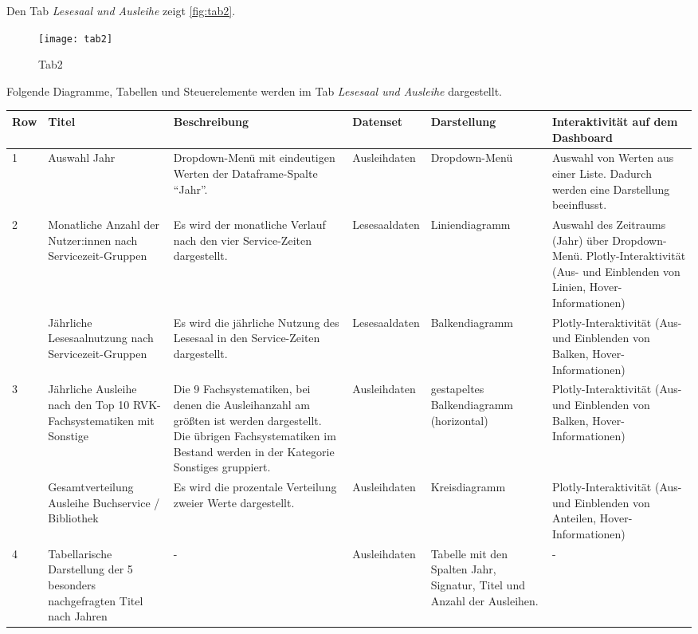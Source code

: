 Den Tab \textit{Lesesaal und Ausleihe} zeigt \autoref{fig:tab2}.

    \begin{figure}[H]
        \centering
            \texttt{[image: tab2]}
            \caption{Tab2}
            \label{fig:tab2}
    \end{figure}
    
\clearpage
Folgende Diagramme, Tabellen und Steuerelemente werden im Tab \textit{Lesesaal und Ausleihe} dargestellt.


    \begingroup
    \setlength{\tabcolsep}{12pt} %
    \renewcommand{\arraystretch}{1.5} 
    \begin{table}[H]
        \centering
        \begin{adjustbox}{max width=\textwidth}
        \begin{tabular}{p{}p{}p{}p{}p{}p{}}
           \toprule
           Row        &Titel &Beschreibung &Datenset &Darstellung &Interaktivität auf dem Dashboard\\
           \midrule
            1           &Auswahl  Jahr &Dropdown-Menü mit eindeutigen Werten der Dataframe-Spalte \enquote{Jahr}.&Ausleihdaten&Dropdown-Menü &Auswahl von Werten aus einer Liste. Dadurch werden eine Darstellung beeinflusst.\\
           \midrule
            2           &Monatliche Anzahl der Nutzer:innen nach Servicezeit-Gruppen&Es wird der monatliche Verlauf nach den vier Service-Zeiten dargestellt.&Lesesaaldaten&Liniendiagramm&Auswahl des Zeitraums (Jahr) über Dropdown-Menü. Plotly-Interaktivität (Aus- und Einblenden von Linien, Hover-Informationen)\\
                        &Jährliche Lesesaalnutzung nach Servicezeit-Gruppen&Es wird die jährliche Nutzung des Lesesaal in den Service-Zeiten dargestellt.&Lesesaaldaten&Balkendiagramm    &Plotly-Interaktivität (Aus- und Einblenden von Balken, Hover-Informationen)\\          
            \midrule
            3           &Jährliche Ausleihe nach den Top 10 RVK-Fachsystematiken mit Sonstige&Die 9 Fachsystematiken, bei denen die Ausleihanzahl am größten ist werden dargestellt. Die übrigen Fachsystematiken im Bestand werden in der Kategorie Sonstiges gruppiert.&Ausleihdaten&gestapeltes Balkendiagramm (horizontal)&Plotly-Interaktivität (Aus- und Einblenden von Balken, Hover-Informationen)\\
                        &Gesamtverteilung Ausleihe Buchservice / Bibliothek&Es wird die prozentale Verteilung zweier Werte dargestellt.&Ausleihdaten    &Kreisdiagramm   &Plotly-Interaktivität (Aus- und Einblenden von Anteilen, Hover-Informationen)\\
            \midrule
            4           &Tabellarische Darstellung der 5 besonders nachgefragten Titel nach Jahren&-&Ausleihdaten    &Tabelle mit den Spalten Jahr, Signatur, Titel und Anzahl der Ausleihen.&-\\


\end{tabular}
\end{adjustbox}
\end{table}
